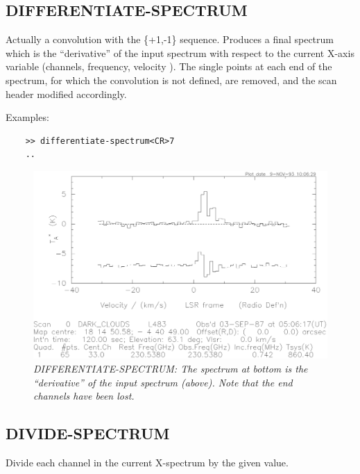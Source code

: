 \documentclass[11pt,twoside]{report}
\begin{document}
\subsection{DIFFERENTIATE-SPECTRUM} 

Actually a convolution with the \{+1,-1\} sequence. Produces a final spectrum
which is the ``derivative'' of the input spectrum with respect to the
current X-axis variable (channels, frequency, velocity \etc). The single points
at each end of the spectrum, for which the convolution is not defined, are
removed, and the scan header modified accordingly.

Examples:
\begin{verbatim}
    >> differentiate-spectrum<CR>7
    ..
\end{verbatim}

\begin{figure}[htbp]
\begin{center}
\includegraphics[scale=0.65]{diff.ps}
\protect\parbox{5.5in}
{\caption[DIFF]
{\sl
DIFFERENTIATE-SPECTRUM: The spectrum at bottom is the ``derivative'' of the
input spectrum (above). Note that the end channels have been lost.
\label{DIFF}
}
}
\end{center}
\end{figure}

\subsection{DIVIDE-SPECTRUM} 

Divide each channel in the current X-spectrum by the given value.
\end{document}
